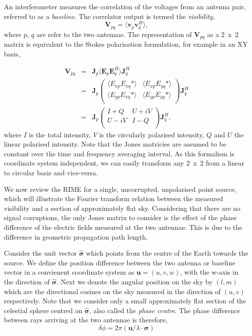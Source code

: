 An interferometer measures the correlation of the voltages from an antenna pair, referred to as a  \emph{baseline}. The correlator output is termed the \emph{visibility}, 
\begin{equation}
\bm{V}_{pq} = \langle {\bm v}_p  {\bm v}_q^H \rangle,
\end{equation}
where $p$, $q$ are refer to the two antennae. The representation of  $\bm{V}_{pq}$ as a 2~x~2 matrix is equivalent to the Stokes polarisation formulation, for example in an XY basis,


\begin{eqnarray}
\bm{V}_{pq} &= & \bm{J}_p \langle {\bm E}_p  {\bm E}_q^H \rangle \bm{J}_q^H \\
&=&  \bm{J}_p\left(
\begin{array}{cc}
\langle E_{xp} E_{xq}* \rangle & \langle E_{xp} E_{yq}* \rangle \\
\langle E_{yp} E_{xq}* \rangle & \langle E_{yp} E_{yq}* \rangle \\
\end{array} 
\right) \bm{J}_q^H \\ 
&=&
 \bm{J}_p \left(
\begin{array}{cc}
I+Q & U +iV\\
U-iV & I-Q \\
\end{array}
\right)\bm{J}_q^H,
\end{eqnarray}
where $I$ is the total intensity, $V$ is the circularly polarised intensity, $Q$ and $U$ the linear polarised intensity. Note that the Jones matricies are assumed to be constant over the time and frequency averaging interval. As this formalism is coordinate system independent, we can easily transform any 2~x~2 from a linear to circular basis and vice-versa. 

We now review the RIME for a single, uncorrupted, unpolarised point source, which will illustrate the Fourier transform relation between the measured visibility and a section of approximately flat sky.
Considering that there are no signal corruptions, the only Jones matrix to consider is the effect of the phase difference of the electric fields measured at the two antennae. This is due to the difference in geometric propagation path length.


Consider the unit vector $\hat{\bm{\sigma}}$ which points from the centre of the Earth towards the source. We define the position difference between the two antenna or baseline vector in a convienent coordinate system as $\bm{u} = (u,v,w)$,  with the w-axis in the direction of $\hat{\bm{\sigma}}$. Next we denote the angular position on the sky by $(l, m)$ which are the directional cosines on the sky measured in the direction of $(u, v)$ respectively. Note that we consider only a small approximately flat section of the celestial sphere centred on $\hat{\bm{\sigma}}$, also called the \emph{phase centre}. The phase difference between rays arriving at the two antennae is therefore,
\begin{equation}
 \delta \phi = 2\pi (\bm{u}/\lambda \cdot \bm{\sigma})
\end{equation}

